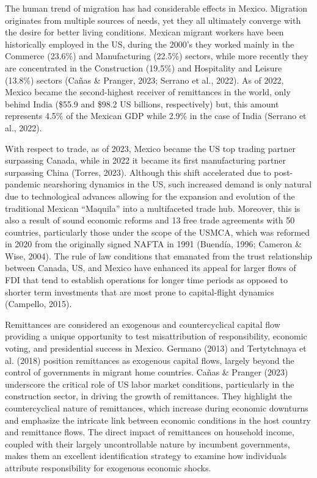 \documentclass[
]{article}
\begin{document}
The human trend of migration has had considerable effects in Mexico.
Migration originates from multiple sources of needs, yet they all
ultimately converge with the desire for better living conditions.
Mexican migrant workers have been historically employed in the US,
during the 2000's they worked mainly in the Commerce (23.6\%) and
Manufacturing (22.5\%) sectors, while more recently they are
concentrated in the Construction (19.5\%) and Hospitality and Leisure
(13.8\%) sectors (Cañas \& Pranger, 2023; Serrano et al., 2022). As of
2022, Mexico became the second-highest receiver of remittances in the
world, only behind India (\$55.9 and \$98.2 US billions, respectively)
but, this amount represents 4.5\% of the Mexican GDP while 2.9\% in the
case of India (Serrano et al., 2022).

With respect to trade, as of 2023, Mexico became the US top trading
partner surpassing Canada, while in 2022 it became its first
manufacturing partner surpassing China (Torres, 2023). Although this
shift accelerated due to post-pandemic nearshoring dynamics in the US,
such increased demand is only natural due to technological advances
allowing for the expansion and evolution of the traditional Mexican
``Maquila'' into a multifaceted trade hub. Moreover, this is also a
result of sound economic reforms and 13 free trade agreements with 50
countries, particularly those under the scope of the USMCA, which was
reformed in 2020 from the originally signed NAFTA in 1991 (Buendía,
1996; Cameron \& Wise, 2004). The rule of law conditions that emanated
from the trust relationship between Canada, US, and Mexico have enhanced
its appeal for larger flows of FDI that tend to establish operations for
longer time periods as opposed to shorter term investments that are most
prone to capital-flight dynamics (Campello, 2015).

Remittances are considered an exogenous and countercyclical capital flow
providing a unique opportunity to test misattribution of responsibility,
economic voting, and presidential success in Mexico. Germano (2013) and
Tertytchnaya et al. (2018) position remittances as exogenous capital
flows, largely beyond the control of governments in migrant home
countries. Cañas \& Pranger (2023) underscore the critical role of US
labor market conditions, particularly in the construction sector, in
driving the growth of remittances. They highlight the countercyclical
nature of remittances, which increase during economic downturns and
emphasize the intricate link between economic conditions in the host
country and remittance flows. The direct impact of remittances on
household income, coupled with their largely uncontrollable nature by
incumbent governments, makes them an excellent identification strategy
to examine how individuals attribute responsibility for exogenous
economic shocks.
\end{document}
